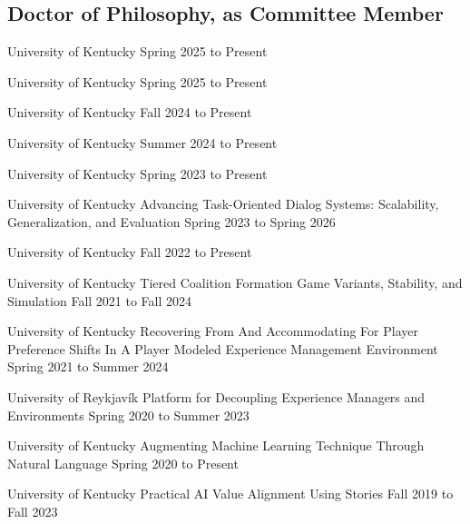 \documentclass{cv}
\begin{document}
\subsection*{Doctor of Philosophy, as Committee Member}
\begin{etaremune}[itemsep=0pt,parsep=0pt]
	\item {}
		{University of Kentucky}
		{}
		{Spring 2025 to Present}
	\item {}
		{University of Kentucky}
		{}
		{Spring 2025 to Present}
	\item {}
		{University of Kentucky}
		{}
		{Fall 2024 to Present}
	\item {}
		{University of Kentucky}
		{}
		{Summer 2024 to Present}
	\item {}
		{University of Kentucky}
		{}
		{Spring 2023 to Present}
	\item {}
		{University of Kentucky}
		{Advancing Task-Oriented Dialog Systems: Scalability, Generalization, and Evaluation}
		{Spring 2023 to Spring 2026}
	\item {}
		{University of Kentucky}
		{}
		{Fall 2022 to Present}
	\item {}
		{University of Kentucky}
		{Tiered Coalition Formation Game Variants, Stability, and Simulation}
		{Fall 2021 to Fall 2024}
	\item {}
		{University of Kentucky}
		{Recovering From And Accommodating For Player Preference Shifts In A Player Modeled Experience Management Environment}
		{Spring 2021 to Summer 2024}
	\item {}
		{University of Reykjavík}
		{Platform for Decoupling Experience Managers and Environments}
		{Spring 2020 to Summer 2023}
	\item {}
		{University of Kentucky}
		{Augmenting Machine Learning Technique Through Natural Language}
		{Spring 2020 to Present}
	\item {}
		{University of Kentucky}
		{Practical AI Value Alignment Using Stories}
		{Fall 2019 to Fall 2023}
\end{etaremune}
\end{document}
